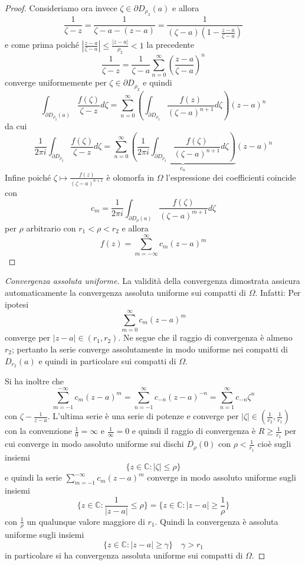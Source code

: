 \begin{proof}
Consideriamo ora invece \(\zeta \in \partial D_{\rho_{2}} {(a)}\) e allora
\[
    \frac{1}{\zeta -z} = \frac{1}{\zeta - a - {(z-a)}} = \frac{1}{{(\zeta
    -a)}{\left( 1 - \frac{z -a}{\zeta -a} \right)} }
\]
e come prima poiché \(\left| \frac{z -a}{\zeta -a} \right|\le \frac{|z-a|}{\rho_{2}} <
1 \)  la precedente 
\[
    \frac{1}{\zeta -z} = \frac{1}{\zeta -a} \sum_{n=0}^{\infty} {\left( \frac{z
    -a}{\zeta -a} \right)} ^{n} 
\]
converge uniformemente per \(\zeta \in \partial D_{\rho_{2}} \) e quindi
\[
    \int_{\partial D_{\rho_{2}}{(a)}} \frac{f{(\zeta)}}{\zeta - z} d \zeta =
    \sum_{n=0}^{\infty} {\left( \int_{\partial D_{\rho_{2}} }
            \frac{f{(z)}}{{(\zeta -a)}^{n+1}}d \zeta \right)} {(z -a)}^{n}
\]
da cui
\[
    \frac{1}{2\pi i} \int_{\partial D_{\rho_{2}} } \frac{f{(\zeta)}}{\zeta - z}
    d \zeta = \sum_{n=0}^{\infty} \underbrace{\left( \frac{1}{2 \pi i} \int_{\partial
    D_{\rho_{2}} } \frac{f{(\zeta)}}{{(\zeta - a)}^{n+1}}d \zeta \right)}_{c_{n}}  {(z-
a)}^{n}
\]
Infine poiché \(\zeta \mapsto \frac{f{(z)}}{{(\zeta-a)}^{n+1}}\) è olomorfa in
\(\Omega\) l'espressione dei coefficienti coincide con
\[
    c_{m} = \frac{1}{2\pi i} \int_{\partial D_\rho {(a)}}
    \frac{f{(\zeta)}}{{(\zeta -a)}^{m+1}} d \zeta
\]
per \(\rho\) arbitrario con \(r_{1} < \rho < r_{2}\) e allora
\[
    f{(z)} = \sum_{m=-\infty}^{\infty} c_{m} {(z-a)}^{m}
\]
\end{proof}
\begin{proof}[Convergenza assoluta uniforme]
    La validità della convergenza dimostrata assicura automaticamente la
    convergenza assoluta uniforme sui compatti di \(\Omega\). Infatti:
    Per ipotesi
    \[
        \sum_{m=0}^{\infty} c_{m} {(z-a)}^{m}
    \]
    converge per \(|z-a| \in (r_{1},r_{2})\). Ne segue che il raggio di
    convergenza è almeno \(r_{2}\); pertanto la serie converge assolutamente in
    modo uniforme nei compatti di \(D_{r_{2}} {(a)}\) e quindi in particolare
    sui compatti di \(\Omega\). 

    Si ha inoltre che
    \[
        \sum_{m=-1}^{-\infty} c_{m} {(z-a)}^{m} = \sum_{n=-1}^{\infty} c_{-n}
        {(z-a)}^{-n} = \sum_{n=1}^{\infty} c_{-n} \zeta^{n}
    \]
    con \(\zeta - \frac{1}{z-a}\). L'ultima serie è una serie di potenze e
    converge per \(|\zeta| \in (\frac{1}{r_{2}}, \frac{1}{r_{1}})\) con la
    convenzione \(\frac{1}{0} = \infty\) e \(\frac{1}{\infty} = 0\) e quindi il
    raggio di convergenza è \(R \ge \frac{1}{r_{1}}\) per cui converge in modo
    assoluto uniforme sui dischi \(\overline{D_{\rho} }{(0)}\) con \(\rho <
    \frac{1}{r_{1}}\) cioè sugli insiemi
\[
    \{z \in \mathbb{C} : |\zeta| \le \rho\} 
\]
    e quindi la serie \(\sum_{m=-1}^{-\infty} c_{m} {(z-a)}^{m} \) converge in
    modo assoluto uniforme sugli insiemi
\[
    \{z \in \mathbb{C} : \frac{1}{|z-a|} \le \rho\} = \{z \in \mathbb{C} : |z-a|
    \ge \frac{1}{\rho}\}
\]
    con \(\frac{1}{\rho}\) un qualunque valore maggiore di \(r_{1}\). Quindi la
    convergenza è assoluta uniforme sugli insiemi
\[
    \{z \in \mathbb{C}: |z-a| \ge \gamma\} \quad \gamma > r_{1}
\]
    in particolare si ha convergenza assoluta uniforme sui compatti di
    \(\Omega\).
\end{proof}
